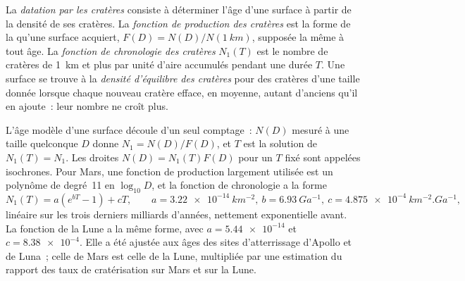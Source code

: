 \begin{definition}\label{def:b3:planetary-interiors-surfaces:crater-dating}
La \emph{datation par les cratères} consiste à déterminer l'âge
d'une surface à partir de la densité de ses cratères. La \emph{fonction de production
des cratères} est la forme de la
 qu'une surface acquiert, $F(D) =
N(D)/N(\qty{1}{km})$, supposée la même à tout âge. La \emph{fonction de chronologie
des cratères} $N_1(T)$ est le
nombre de cratères de \qty{1}{km} et plus par unité d'aire accumulés pendant une
durée $T$. Une surface se trouve à la \emph{densité d'équilibre
des cratères} pour des cratères d'une taille donnée
lorsque chaque nouveau cratère efface, en moyenne, autant d'anciens qu'il en ajoute~:
leur nombre ne croît plus.
\end{definition}

L'âge modèle d'une surface découle d'un seul comptage~: $N(D)$ mesuré à une taille quelconque
$D$ donne $N_1 = N(D)/F(D)$, et $T$ est la solution de $N_1(T) = N_1$. Les droites
$N(D) = N_1(T)F(D)$ pour un $T$ fixé sont appelées isochrones. Pour Mars, une fonction de
production largement utilisée est un polynôme de degré~11 en $\log_{10}D$, et
la fonction de chronologie a la forme
\[
  N_1(T) = a\left(e^{bT} - 1\right) + cT , \qquad
  a = \qty{3.22e-14}{km^{-2}}, \ b = \qty{6.93}{Ga^{-1}}, \
  c = \qty{4.875e-4}{km^{-2}.Ga^{-1}} ,
\]
linéaire sur les trois derniers milliards d'années, nettement exponentielle avant. La
fonction de la Lune a la même forme, avec $a = \num{5.44e-14}$ et $c =
\num{8.38e-4}$. Elle a été ajustée aux âges des sites d'atterrissage d'Apollo et de Luna~;
celle de Mars est celle de la Lune, multipliée par une estimation du rapport
des taux de cratérisation sur Mars et sur la Lune.


